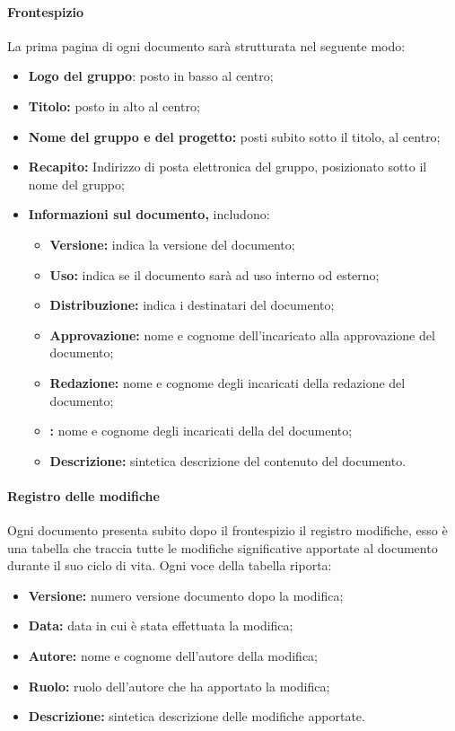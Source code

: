 \paragraph{Frontespizio}    
La prima pagina di ogni documento sarà strutturata nel seguente modo:
\begin{itemize}
	\item \textbf{Logo del gruppo}: posto in basso al centro;
	\item \textbf{Titolo:} posto in alto al centro;
	\item \textbf{Nome del gruppo e del progetto:} posti subito sotto il titolo, al centro;
	\item \textbf{Recapito:} Indirizzo di posta elettronica del gruppo, posizionato sotto il nome del gruppo;
	\item \textbf{Informazioni sul documento,} includono:
	\begin{itemize}
		\item \textbf{Versione:} indica la versione del documento;
		\item \textbf{Uso:} indica se il documento sarà ad uso interno od esterno;
		\item \textbf{Distribuzione:} indica i destinatari del documento;
		\item \textbf{Approvazione:} nome e cognome dell'incaricato alla approvazione del documento;
		\item \textbf{Redazione:} nome e cognome degli incaricati della redazione del documento;
		\item \textbf{:} nome e cognome degli incaricati della  del documento;
		\item \textbf{Descrizione:} sintetica descrizione del contenuto del documento.
	\end{itemize}
\end{itemize}
\paragraph{Registro delle modifiche}      
Ogni documento presenta subito dopo il frontespizio il registro modifiche, esso è una tabella che traccia tutte le modifiche significative apportate al documento durante il suo ciclo di vita. Ogni voce della tabella riporta:
\begin{itemize}
	\item \textbf{Versione:} numero versione documento dopo la modifica;
	\item \textbf{Data:} data in cui è stata effettuata la modifica;
	\item \textbf{Autore:} nome e cognome dell'autore della modifica;
	\item \textbf{Ruolo:} ruolo dell'autore che ha apportato la modifica;
	\item \textbf{Descrizione:} sintetica descrizione delle modifiche apportate.
\end{itemize}
